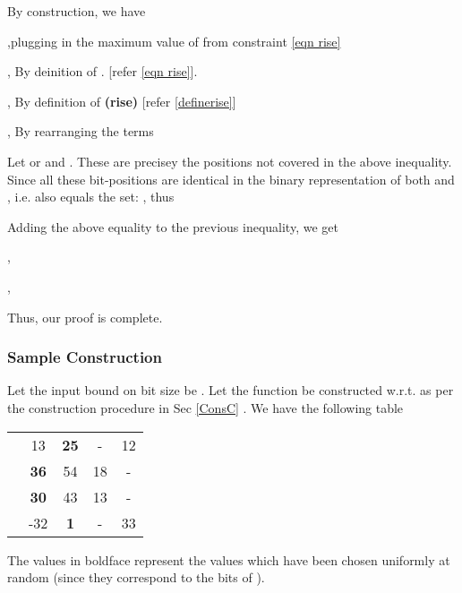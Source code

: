 \documentclass[11pt, letterpaper, romanappendices, onecolumn]{article}
\theoremstyle{plain}\newtheorem{thm}{Theorem}[section]
\theoremstyle{definition}
\theoremstyle{remark}
\begin{document}
\par By construction, we have
\begin{flushleft}



,\quad plugging in the maximum value of  from constraint \ref{eqn rise}

, \quad By deinition of . [refer \ref{eqn rise}].

, \quad By definition of \textbf{(rise)} [refer \ref{definerise}]

, \quad By rearranging the terms

\par Let  or  and . These are precisey the positions not covered in the above inequality. Since all these bit-positions are identical in the binary representation of both  and , i.e.  also equals the set: , thus




Adding the above equality to the previous inequality, we get



, 

, 

\end{flushleft}

Thus, our proof is complete.

\subsubsection{Sample Construction}
\par Let the input bound on bit size be . Let the function  be constructed w.r.t.  as per the construction procedure in Sec \ref{ConsC} . We have the following table
\begin{center}
	\begin{tabular}{|c|c|c|c|c|}\hline
	 &  &  &  & \\\hline
	 & 13 & \textbf{25} & - & 12 \\\hline
	 & \textbf{36} & 54 & 18 & - \\\hline
	 & \textbf{30} & 43 & 13 & - \\\hline
	 & -32 & \textbf{1} & - & 33 \\\hline 
	\end{tabular}
\end{center}
The values in boldface represent the values which have been chosen uniformly at random (since they correspond to the bits of ).
\end{document}
